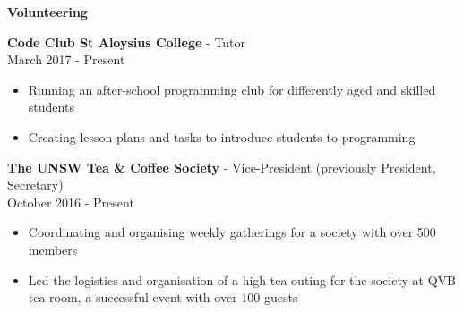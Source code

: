 \documentclass[a4paper]{article}
\newcommand{\minititle}[1]{{\Large \begin{center} \textbf{#1} \end{center}} \vspace{0.2cm}}
\newcommand{\resumeEntry}[3]{{\large \textbf{#1} - #2} \\ \small{#3} }
\begin{document}
\begin{minipage}[t]{0.6\linewidth}
{\begin{itemize}
        \end{itemize}
    }
    {
        \vspace{0.05cm}
        \minititle{Volunteering}
        \resumeEntry{Code Club St Aloysius College}{Tutor}{March 2017 - Present}
        \begin{itemize}
            \setlength\itemsep{0.03cm}
            \item Running an after-school programming club for differently aged and skilled students
            \item Creating lesson plans and tasks to introduce students to programming
        \end{itemize}
        \vspace{0.4cm}
        \resumeEntry{The UNSW Tea \& Coffee Society}{Vice-President (previously President, Secretary)}{October 2016 - Present}
        \begin{itemize}
            \setlength\itemsep{0.03cm}
            \item Coordinating and organising weekly gatherings for a society with over 500 members 
            \item Led the logistics and organisation of a high tea outing for the society at QVB tea room, a successful event with over 100 guests
        \end{itemize}
    }
\end{minipage}\hspace{0.8cm}
\end{document}
